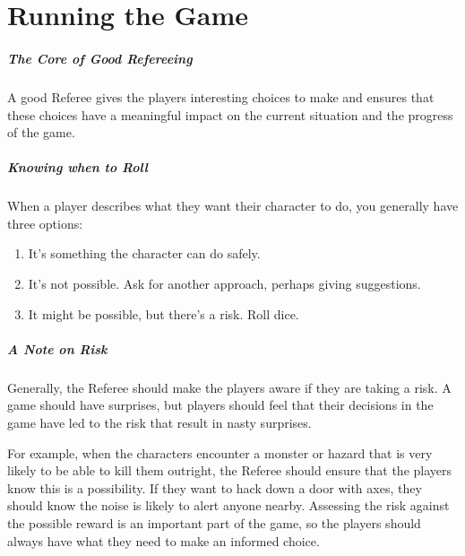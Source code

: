 \documentclass[itdr]{subfiles}
\begin{document}

\chapter{Running the Game}
\label{ch:running_the_game}

\paragraph{The Core of Good Refereeing}
A good Referee gives the players interesting choices to make and ensures that these choices have a meaningful impact on the current situation and the progress of the game.

\vfill

\paragraph{Knowing when to Roll}
When a player describes what they want their character to do, you generally
have three options:
\begin{enumerate}
	\item It's something the character can do safely.
	\item It's not possible. Ask for another approach, \mbox{perhaps} giving suggestions.
	\item It might be possible, but there's a risk. Roll dice.
\end{enumerate}

\vfill

\paragraph{A Note on Risk}
Generally, the Referee should make the players aware if they are taking a risk. A game should have surprises, but players should feel that their decisions in the game have led to the risk that result in nasty surprises.

For example, when the characters encounter a monster or hazard that is very likely to be able to kill them outright, the Referee should ensure that the players know this is a possibility. If they want to hack down a door with axes, they should know the noise is likely to alert anyone nearby. Assessing the risk against the possible reward is an important part of the game, so the players should always have what they need to make an informed choice.

\vfill
\end{document}
